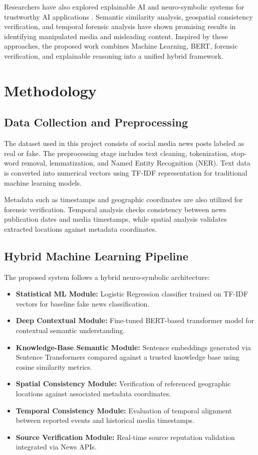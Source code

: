 \documentclass[conference]{IEEEtran}
\begin{document}
Researchers have also explored explainable AI and neuro-symbolic systems for trustworthy AI applications \cite{ribeiro2016why}. Semantic similarity analysis, geospatial consistency verification, and temporal forensic analysis have shown promising results in identifying manipulated media and misleading content. Inspired by these approaches, the proposed work combines Machine Learning, BERT, forensic verification, and explainable reasoning into a unified hybrid framework.

\section{Methodology}

\subsection{Data Collection and Preprocessing}
The dataset used in this project consists of social media news posts labeled as real or fake. The preprocessing stage includes text cleaning, tokenization, stop-word removal, lemmatization, and Named Entity Recognition (NER). Text data is converted into numerical vectors using TF-IDF representation for traditional machine learning models.

Metadata such as timestamps and geographic coordinates are also utilized for forensic verification. Temporal analysis checks consistency between news publication dates and media timestamps, while spatial analysis validates extracted locations against metadata coordinates.

\subsection{Hybrid Machine Learning Pipeline}
The proposed system follows a hybrid neuro-symbolic architecture:
\begin{itemize}
    \item \textbf{Statistical ML Module:} Logistic Regression classifier trained on TF-IDF vectors for baseline fake news classification.
    \item \textbf{Deep Contextual Module:} Fine-tuned BERT-based transformer model for contextual semantic understanding.
    \item \textbf{Knowledge-Base Semantic Module:} Sentence embeddings generated via Sentence Transformers compared against a trusted knowledge base using cosine similarity metrics.
    \item \textbf{Spatial Consistency Module:} Verification of referenced geographic locations against associated metadata coordinates.
    \item \textbf{Temporal Consistency Module:} Evaluation of temporal alignment between reported events and historical media timestamps.
    \item \textbf{Source Verification Module:} Real-time source reputation validation integrated via News APIs.
\end{itemize}
\end{document}
